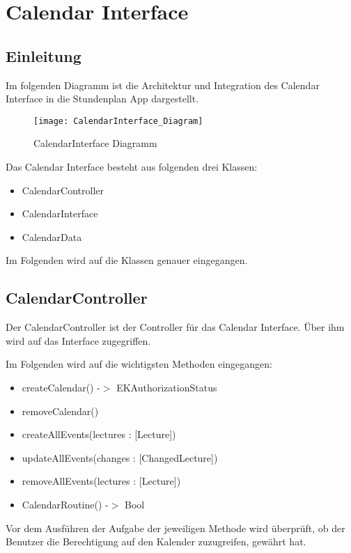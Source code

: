 \chapter{Calendar Interface}
\section{Einleitung}
Im folgenden Diagramm ist die Architektur und Integration des Calendar Interface in die Stundenplan App dargestellt.
\begin{figure}[htb]
    \centering
    \texttt{[image: CalendarInterface\_Diagram]}
    \caption{CalendarInterface Diagramm}
\end{figure}

Das Calendar Interface besteht aus folgenden drei Klassen:
\begin{itemize}
     \item CalendarController
     \item CalendarInterface
     \item CalendarData
\end{itemize}

Im Folgenden wird auf die Klassen genauer eingegangen.

\newpage
\section{CalendarController}
Der CalendarController ist der Controller für das Calendar Interface. Über ihm wird auf das Interface zugegriffen.

Im Folgenden wird auf die wichtigsten Methoden eingegangen:
\begin{itemize}
     \item createCalendar() -$>$ EKAuthorizationStatus
     \item removeCalendar()
     \item createAllEvents(lectures : [Lecture])
     \item updateAllEvents(changes : [ChangedLecture])
     \item removeAllEvents(lectures : [Lecture])
     \item CalendarRoutine() -$>$ Bool
\end{itemize}

Vor dem Ausführen der Aufgabe der jeweiligen Methode wird überprüft, ob der Benutzer die Berechtigung auf den Kalender zuzugreifen, gewährt hat.

